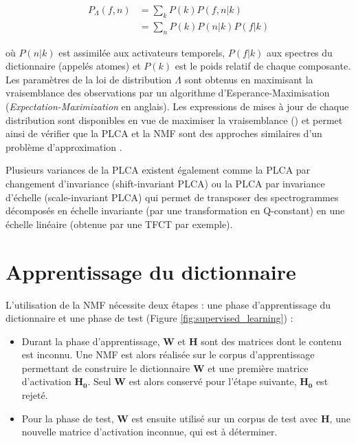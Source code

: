 \begin{align}
P_{\Lambda}\left(f,n\right) &= \sum_k P\left( k \right)P\left(f, n\vert k \right)\\
& = \sum_n P(k)P \left(n \vert k\right)P\left(f \vert k \right)
\end{align}

où $P\left( n \vert k \right)$ est assimilée aux activateurs temporels, $P\left(f \vert k \right)$ aux spectres du dictionnaire (appelés atomes) et $P\left(k \right)$ est le poids relatif de chaque composante. Les paramètres de la loi de distribution $\Lambda$ sont obtenus en maximisant la vraisemblance des observations par un algorithme d'{Esperance-Maximisation} (\textit{Expectation-Maximization} en anglais). Les expressions de mises à jour de chaque distribution sont disponibles en vue de maximiser la vraisemblance (\cite{shashanka_probabilistic_2008}) et permet ainsi de vérifier que la PLCA et la NMF sont des approches similaires d'un problème d'approximation \cite{gaussier_relation_2005}.

Plusieurs variances de la PLCA existent également comme la PLCA par changement d'invariance (shift-invariant PLCA) \cite{smaragdis_shift-invariant_2007} ou la PLCA par invariance d'échelle (scale-invariant PLCA) \cite{hennequin_scale-invariant_2011} qui permet de transposer des spectrogrammes décomposés en échelle invariante (par une transformation en Q-constant) en une échelle linéaire (obtenue par une TFCT par exemple).

\section{Apprentissage du dictionnaire}

L'utilisation de la NMF nécessite deux étapes : une phase d'apprentissage du dictionnaire et une phase de test (Figure \ref{fig:supervised_learning}) :

\begin{itemize}
\item Durant la phase d'apprentissage, $\mathbf{W}$ et $\mathbf{H}$ sont des matrices dont le contenu est inconnu. Une NMF est alors réalisée sur le corpus d'apprentissage permettant de construire le dictionnaire $\mathbf{W}$ et une première matrice d'activation $\mathbf{H_0}$. Seul $\mathbf{W}$ est alors conservé pour l'étape suivante, $\mathbf{H_0}$ est rejeté.
\item Pour la phase de test, $\mathbf{W}$ est ensuite utilisé sur un corpus de test avec $\mathbf{H}$, une nouvelle matrice d'activation inconnue, qui est à déterminer.
\end{itemize}


